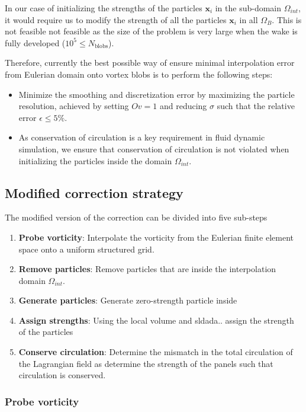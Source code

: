 In our case of initializing the strengths of the particles $\mathbf{x}_i$ in the sub-domain $\Omega_{int}$, it would require us to modify the strength of all the particles $\mathbf{x}_i$ in all $\Omega_B$. This is not feasible not feasible as the size of the problem is very large when the wake is fully developed ($10^5 \leqslant N_{\mathrm{blobs}}$).

Therefore, currently the best possible way of ensure minimal interpolation error from Eulerian domain onto vortex blobs is to perform the following steps:
\begin{itemize}
\item Minimize the smoothing and discretization error by maximizing the particle resolution, achieved by setting $Ov=1$ and reducing $\sigma$ such that the relative error $\epsilon \leqslant 5\%$.
\item As conservation of circulation is a key requirement in fluid dynamic simulation, we ensure that conservation of circulation is not violated when initializing the particles inside the domain $\Omega_{int}$.
\end{itemize}


\subsection{Modified correction strategy}

The modified version of the correction can be divided into five sub-steps
\begin{enumerate}
\item \textbf{Probe vorticity}: Interpolate the vorticity from the Eulerian finite element space onto a uniform structured grid.
\item \textbf{Remove particles}: Remove particles that are inside the interpolation domain $\Omega_{int}$.
\item \textbf{Generate particles}: Generate zero-strength particle inside 
\item \textbf{Assign strengths}: Using the local volume and sldada.. assign the strength of the particles
\item \textbf{Conserve circulation}: Determine the mismatch in the total circulation of the Lagrangian field as determine the strength of the panels such that circulation is conserved.
\end{enumerate}

\subsubsection*{Probe vorticity}

